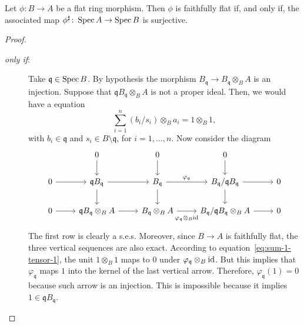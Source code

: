 \begin{thm}\label{thm:ff-equals-onto}
    Let\/ $\phi\colon B\to A$ be a flat ring morphism. Then\/ $\phi$ is faithfully flat if, and only if, the associated map\/ $\phi^\sharp\colon\operatorname{Spec} A\to\operatorname{Spec} B$ is surjective.
\end{thm}

\begin{proof}${}$
    \begin{description}
        \item[\rm\textit{only if}:] Take $\mathfrak q\in\operatorname{Spec} B$. By hypothesis the morphism $B_{\mathfrak q}\to B_{\mathfrak q}\otimes_BA$ is an injection. Suppose that $\mathfrak qB_{\mathfrak q}\otimes_BA$ is not a proper ideal. Then, we would have a equation
        \begin{equation}\label{eq:sum-1-tensor-1}
            \sum_{i=1}^n(b_i/s_i)\otimes_Ba_i=1\otimes_B1,
        \end{equation}
        with $b_i\in\mathfrak q$ and $s_i\in B\setminus\mathfrak q$, for $i=1,\dots,n$. Now consider the diagram
        \small
        $$
            \begin{tikzcd}
                    &0
                        \arrow[d]
                    &0
                        \arrow[d]
                    &0
                        \arrow[d]&\\
                0
                        \arrow[r]
                    &\mathfrak qB_{\mathfrak q}
                        \arrow[r]
                        \arrow[d]
                    &B_{\mathfrak q}
                        \arrow[d]
                        \arrow[r,"\varphi_{\mathfrak q}"]
                    &B_{\mathfrak q}/\mathfrak qB_{\mathfrak q}
                        \arrow[d]
                        \arrow[r]
                    &0\\
                0
                        \arrow[r]
                    &\mathfrak qB_{\mathfrak q}\otimes_BA
                        \arrow[r]
                    &B_{\mathfrak q}\otimes_BA
                        \arrow[r,"\varphi_{\mathfrak q}
                            \otimes_B\id\vphantom{\big|}"']
                    &B_{\mathfrak q}/\mathfrak qB_{\mathfrak q}
                        \otimes_BA
                        \arrow[r]
                    &0
            \end{tikzcd}
        $$
        \normalsize
        The first row is clearly a s.e.s. Moreover, since $B\to A$ is faithfully flat, the three vertical sequences are also exact. According to equation~\eqref{eq:sum-1-tensor-1}, the unit $1\otimes_B1$ maps to $0$ under $\varphi_{\mathfrak q}\otimes_B\text{\rm id}$. But this implies that $\varphi_{\mathfrak q}$ maps $1$ into the kernel of the last vertical arrow. Therefore, $\varphi_{\mathfrak q}(1)= 0$ because such arrow is an injection. This is impossible because it implies $1\in\mathfrak qB_{\mathfrak q}$.


\end{description}
\end{proof}

